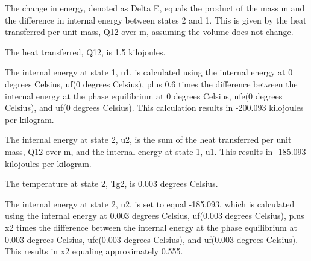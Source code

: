The change in energy, denoted as Delta E, equals the product of the mass m and the difference in internal energy between states 2 and 1. This is given by the heat transferred per unit mass, Q12 over m, assuming the volume does not change.

The heat transferred, Q12, is 1.5 kilojoules.

The internal energy at state 1, u1, is calculated using the internal energy at 0 degrees Celsius, uf(0 degrees Celsius), plus 0.6 times the difference between the internal energy at the phase equilibrium at 0 degrees Celsius, ufe(0 degrees Celsius), and uf(0 degrees Celsius). This calculation results in -200.093 kilojoules per kilogram.

The internal energy at state 2, u2, is the sum of the heat transferred per unit mass, Q12 over m, and the internal energy at state 1, u1. This results in -185.093 kilojoules per kilogram.

The temperature at state 2, Tg2, is 0.003 degrees Celsius.

The internal energy at state 2, u2, is set to equal -185.093, which is calculated using the internal energy at 0.003 degrees Celsius, uf(0.003 degrees Celsius), plus x2 times the difference between the internal energy at the phase equilibrium at 0.003 degrees Celsius, ufe(0.003 degrees Celsius), and uf(0.003 degrees Celsius). This results in x2 equaling approximately 0.555.